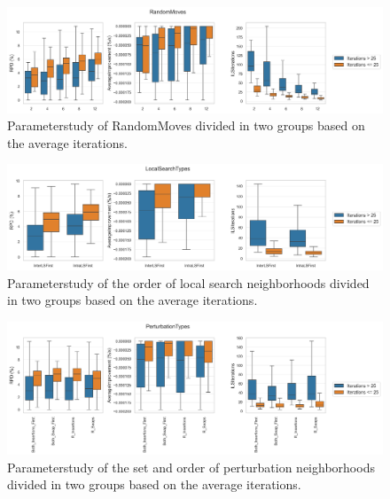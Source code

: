 \begin{figure}[!ht]
    \centering
    \includegraphics[width=\textwidth]{pictures/parameter_study/RandomMoves_base_parameter_study.png}
    \caption{Parameterstudy of RandomMoves divided in two groups based on the average iterations.}
    \label{fig:parameterstudy_NoClassifier_RandomMoves}
\end{figure}

\begin{figure}[!ht]
    \centering
    \includegraphics[width=\textwidth]{pictures/parameter_study/LocalSearchTypes_base_parameter_study.png}
    \caption{Parameterstudy of the order of local search neighborhoods divided in two groups based on the average iterations.}
    \label{fig:parameterstudy_NoClassifier_localSearch}
\end{figure}

\begin{figure}[!ht]
    \centering
    \includegraphics[width=\textwidth]{pictures/parameter_study/PerturbationTypes_base_parameter_study.png}
    \caption{Parameterstudy of the set and order of perturbation neighborhoods divided in two groups based on the average iterations.}
    \label{fig:parameterstudy_NoClassifier_perturbation}
\end{figure}

